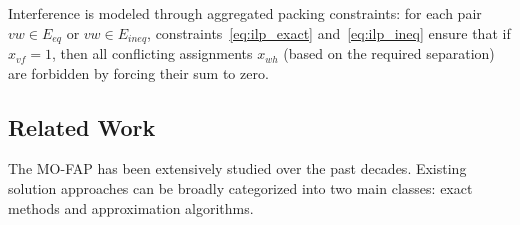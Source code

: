 \documentclass[letterpaper,journal]{IEEEtran}
\begin{document}
Interference is modeled through aggregated packing constraints: for each pair $vw \in E_{eq}$ or $vw \in E_{ineq}$, constraints~\eqref{eq:ilp_exact} and~\eqref{eq:ilp_ineq} ensure that if $x_{vf} = 1$, then all conflicting assignments $x_{wh}$ (based on the required separation) are forbidden by forcing their sum to zero.
\subsection{Related Work}
The MO-FAP has been extensively studied over the past decades. Existing solution approaches can be broadly categorized into two main classes: exact methods and approximation algorithms.
\end{document}

